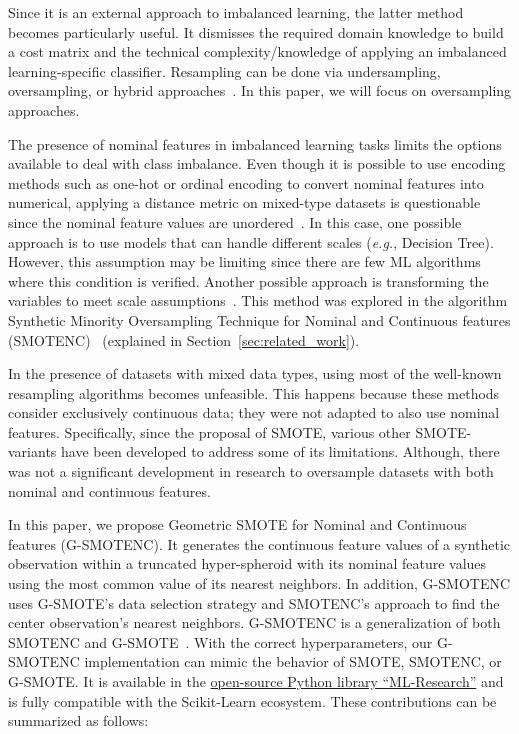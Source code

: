 \documentclass[preprint,12pt]{elsarticle}
\begin{document}
{Since it is an external approach to imbalanced learning, the latter method
becomes particularly useful. It dismisses the required domain knowledge to
build a cost matrix and the technical complexity/knowledge of applying an
imbalanced learning-specific classifier. Resampling can be done via
undersampling, oversampling, or hybrid approaches~\cite{tarekegn2021review}. In
this paper, we will focus on oversampling approaches.

The presence of nominal features in imbalanced learning tasks limits the
options available to deal with class imbalance. Even though it is possible to
use encoding methods such as one-hot or ordinal encoding to convert nominal
features into numerical, applying a distance metric on mixed-type datasets is
questionable since the nominal feature values are
unordered~\cite{lumijarvi2004comparison}. In this case, one possible approach
is to use models that can handle different scales (\textit{e.g.}, Decision
Tree). However, this assumption may be limiting since there are few ML
algorithms where this condition is verified. Another possible approach is
transforming the variables to meet scale
assumptions~\cite{lumijarvi2004comparison}. This method was explored in the
algorithm Synthetic Minority Oversampling Technique for Nominal and Continuous
features (SMOTENC)~\cite{Chawla2002} (explained in
Section~\ref{sec:related_work}).

In the presence of datasets with mixed data types, using most of the
well-known resampling algorithms becomes unfeasible. This happens because
these methods consider exclusively continuous data; they were not adapted to
also use nominal features. Specifically, since the proposal of SMOTE, various
other SMOTE-variants have been developed to address some of its limitations.
Although, there was not a significant development in research to oversample
datasets with both nominal and continuous features. 

In this paper, we propose Geometric SMOTE for Nominal and Continuous features
(G-SMOTENC). It generates the continuous feature values of a synthetic
observation within a truncated hyper-spheroid with its nominal feature values
using the most common value of its nearest neighbors. In addition, G-SMOTENC
uses G-SMOTE's data selection strategy and SMOTENC's approach to find the
center observation's nearest neighbors. G-SMOTENC is a generalization of both
SMOTENC and G-SMOTE~\cite{douzas2019geometric}. With the correct
hyperparameters, our G-SMOTENC implementation can mimic the behavior of SMOTE,
SMOTENC, or G-SMOTE\@. It is available in the
\href{https://github.com/joaopfonseca/ml-research}{open-source Python library
``ML-Research''} and is fully compatible with the Scikit-Learn ecosystem.
These contributions can be summarized as follows:

}
\end{document}
